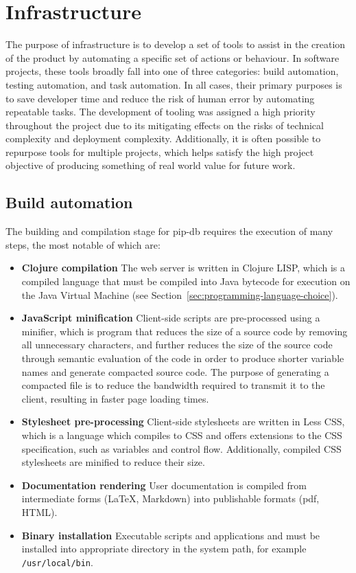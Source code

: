 \chapter{Infrastructure}\label{chap:infrastructure}

The purpose of infrastructure is to develop a set of tools to assist
in the creation of the product by automating a specific set of actions
or behaviour. In software projects, these tools broadly fall into one
of three categories: build automation, testing automation, and task
automation. In all cases, their primary purposes is to save developer
time and reduce the risk of human error by automating repeatable
tasks. The development of tooling was assigned a high priority
throughout the project due to its mitigating effects on the risks of
technical complexity and deployment complexity. Additionally, it is
often possible to repurpose tools for multiple projects, which helps
satisfy the high project objective of producing something of real
world value for future work.

\section{Build automation}\label{sec:build-automation}

The building and compilation stage for pip-db requires the execution
of many steps, the most notable of which are:

\begin{itemize}
\item \textbf{Clojure compilation} The web server is written in
  Clojure LISP, which is a compiled language that must be compiled
  into Java bytecode for execution on the Java Virtual Machine (see
  Section~\ref{sec:programming-language-choice}).
\item \textbf{JavaScript minification} Client-side scripts are
  pre-processed using a minifier, which is program that reduces the
  size of a source code by removing all unnecessary characters, and
  further reduces the size of the source code through semantic
  evaluation of the code in order to produce shorter variable names
  and generate compacted source code. The purpose of generating a
  compacted file is to reduce the bandwidth required to transmit it to
  the client, resulting in faster page loading times.
\item \textbf{Stylesheet pre-processing} Client-side stylesheets are
  written in Less CSS, which is a language which compiles to CSS and
  offers extensions to the CSS specification, such as variables and
  control flow. Additionally, compiled CSS stylesheets are minified to
  reduce their size.
\item \textbf{Documentation rendering} User documentation is compiled
  from intermediate forms (\LaTeX, Markdown) into publishable formats
  (pdf, HTML).
\item \textbf{Binary installation} Executable scripts and applications
  and must be installed into appropriate directory in the system path,
  for example \texttt{/usr/local/bin}.
\end{itemize}

